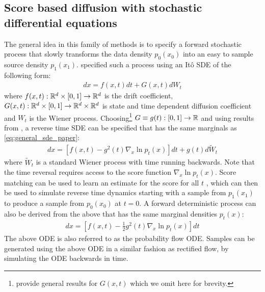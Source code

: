 \subsection{Score based diffusion with stochastic differential equations}
\label{sec:diffusion}

The general idea in this family of methods is to specify a forward stochastic process that slowly transforms the data density $p_0(x_0)$ into an easy to sample source density $p_1(x_1)$.
\citet{song2020score} specified such a process using an It\^o SDE of the following form:
\begin{align}
\label{eq:general_sde_paper}
dx = f(x, t) dt + G(x, t)dW_t
\end{align}
where $f(x,t): \mathbb{R}^d\times [0, 1] \rightarrow \mathbb{R}^d$ is the drift coefficient, $G(x, t) : \mathbb{R}^d\times [0, 1] \rightarrow \mathbb{R}^d \times \mathbb{R}^d$ is state and time dependent diffusion coefficient and $W_t$ is the Wiener process.
Choosing\footnote{%
    \citet{song2020score} provide general results for $G(x, t)$ which we omit here for brevity.
} $G \equiv g(t): [0, 1] \rightarrow \mathbb{R}$ and using results from \cite{anderson1982reverse}, a reverse time SDE can be specified that has the same marginals as \cref{eq:general_sde_paper}:
\begin{align}
\label{eq:reverse_sde_song}
dx = [f(x, t) - g^2(t)\nabla_{x} \ln p_t(x)]dt + g(t)d\tilde W_t
\end{align}
where $\tilde W_t$ is a standard Wiener process with time running backwards.
Note that the time reversal requires access to the score function $\nabla_{x} \ln p_t(x)$.
Score matching \citep{vincent2011connection} can be used to learn an estimate for the score for all $t$ \citep{song2020score}, which can then be used to simulate reverse time dynamics starting with a sample from $p_1(x_1)$ to produce a sample from $p_0(x_0)$ at $t=0$.
A forward deterministic process can also be derived from the above that has the same marginal densities $p_t(x)$:
\begin{align}
\label{eq:probflow_ode_song}
dx = \left[f(x, t) - \frac{1}{2}g^2(t)\nabla_{x} \ln p_t(x)\right]dt
\end{align}
The above ODE is also referred to as the probability flow ODE.
Samples can be generated using the above ODE in a similar fashion as rectified flow, by simulating the ODE backwards in time.

